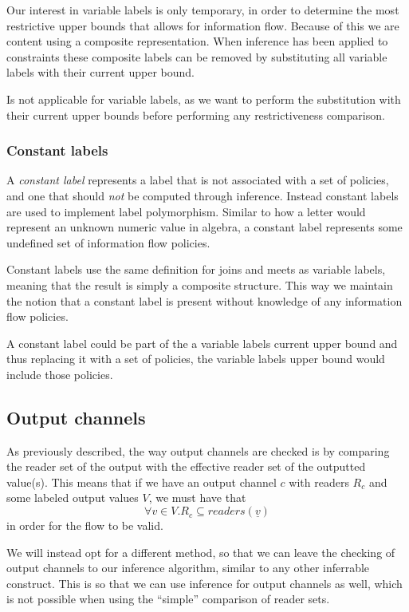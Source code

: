 Our interest in variable labels is only temporary, in order to determine the most restrictive upper bounds that allows for information flow.
Because of this we are content using a composite representation.
When inference has been applied to constraints these composite labels can be removed by substituting all variable labels with their current upper bound.

Is not applicable for variable labels, as we want to perform the substitution with their current upper bounds before performing any restrictiveness comparison.

\subsubsection{Constant labels}
A \textit{constant label} represents a label that is not associated with a set of policies, and one that should \textit{not} be computed through inference.
Instead constant labels are used to implement label polymorphism.
Similar to how a letter would represent an unknown numeric value in algebra, a constant label represents some undefined set of information flow policies.

Constant labels use the same definition for joins and meets as variable labels, meaning that the result is simply a composite structure.
This way we maintain the notion that a constant label is present without knowledge of any information flow policies.

A constant label could be part of the a variable labels current upper bound and thus replacing it with a set of policies, the variable labels upper bound would include those policies.


\subsection{Output channels}
As previously described, the way output channels are checked is by comparing the reader set of the output with the effective reader set of the outputted value(s).
This means that if we have an output channel $c$ with readers $R_c$ and some labeled output values $V$, we must have that
\[ \forall v \in V.R_c \subseteq readers(\underline{v}) \]
in order for the flow to be valid.

We will instead opt for a different method, so that we can leave the checking of output channels to our inference algorithm, similar to any other inferrable construct.
This is so that we can use inference for output channels as well, which is not possible when using the ``simple'' comparison of reader sets.


